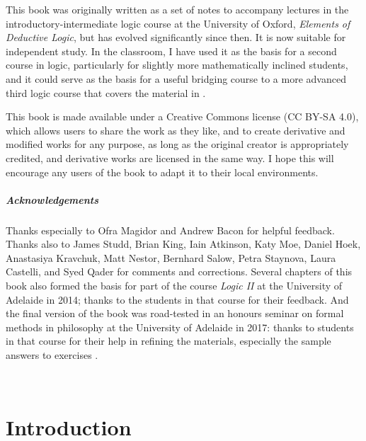 \documentclass[openany,leqno,10pt]{book}
\theoremstyle{break}
\theoremstyle{definition}
\theoremstyle{remark}
\begin{document}
This book was originally written as a set of notes to accompany lectures in the introductory-intermediate logic course at the University of Oxford, \emph{Elements of Deductive Logic}, but has evolved significantly since then. It is now suitable for independent study. In the classroom, I have used it as the basis for a second course in logic, particularly for slightly more mathematically inclined students, and it could serve as the basis for a useful bridging course to a more advanced third logic course that covers the material in \citet{bbjcomlo}.

This book is made available under a Creative Commons license (CC BY-SA 4.0), which allows users to share the work as they like, and to create derivative and modified works for any purpose, as long as the original creator is appropriately credited, and derivative works are licensed in the same way. I hope this will encourage any users of the book to adapt it to their local environments.

\paragraph{Acknowledgements} Thanks especially to Ofra Magidor and Andrew Bacon for helpful feedback. Thanks also to James Studd, Brian King, Iain Atkinson, Katy Moe, Daniel Hoek, Anastasiya Kravchuk, Matt Nestor, Bernhard Salow, Petra Staynova, Laura Castelli, and Syed Qader for comments and corrections. Several chapters of this book also formed the basis for part of the course \emph{Logic II} at the University of Adelaide in 2014; thanks to the students in that course for their feedback. And the final version of the book was road-tested in an honours seminar on formal methods in philosophy at the University of Adelaide in 2017: thanks to students in that course for their help in refining the materials, especially the sample answers to exercises%
.


  

\newpage\tableofcontents{}




\newpage \thispagestyle{empty} ~\\\newpage


\setcounter{chapter}{-1}
\chapter{Introduction}
\end{document}
